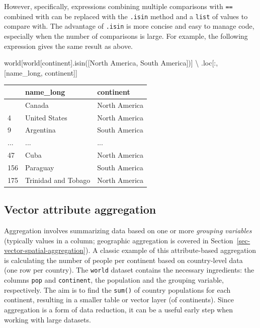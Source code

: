 \documentclass[
  letterpaper,
]{krantz}
\newenvironment{Shaded}{\begin{snugshade}}{\end{snugshade}}
\newcommand{\NormalTok}[1]{\textcolor[rgb]{0.00,0.23,0.31}{#1}}
\newcommand{\OperatorTok}[1]{\textcolor[rgb]{0.37,0.37,0.37}{#1}}
\newcommand{\StringTok}[1]{\textcolor[rgb]{0.13,0.47,0.30}{#1}}
\begin{document}
However, specifically, expressions combining multiple comparisons with
\texttt{==} combined with \texttt{\textbar{}} can be replaced with the
\texttt{.isin} method and a \texttt{list} of values to compare with. The
advantage of \texttt{.isin} is more concise and easy to manage code,
especially when the number of comparisons is large. For example, the
following expression gives the same result as above.

\begin{Shaded}
\begin{Highlighting}[]
\NormalTok{world[world[}\StringTok{\textquotesingle{}continent\textquotesingle{}}\NormalTok{].isin([}\StringTok{\textquotesingle{}North America\textquotesingle{}}\NormalTok{, }\StringTok{\textquotesingle{}South America\textquotesingle{}}\NormalTok{])]  }\OperatorTok{\textbackslash{}}
\NormalTok{    .loc[:, [}\StringTok{\textquotesingle{}name\_long\textquotesingle{}}\NormalTok{, }\StringTok{\textquotesingle{}continent\textquotesingle{}}\NormalTok{]]}
\end{Highlighting}
\end{Shaded}

\begin{longtable}[]{@{}lll@{}}
\toprule\noalign{}
& name\_long & continent \\
\midrule\noalign{}
\endhead
\bottomrule\noalign{}
\endlastfoot
3 & Canada & North America \\
4 & United States & North America \\
9 & Argentina & South America \\
... & ... & ... \\
47 & Cuba & North America \\
156 & Paraguay & South America \\
175 & Trinidad and Tobago & North America \\
\end{longtable}

\subsection{Vector attribute
aggregation}\label{sec-vector-attribute-aggregation}

Aggregation involves summarizing data based on one or more
\emph{grouping variables} (typically values in a column; geographic
aggregation is covered in Section~\ref{sec-vector-spatial-aggregation}).
A classic example of this attribute-based aggregation is calculating the
number of people per continent based on country-level data (one row per
country). The \texttt{world} dataset contains the necessary ingredients:
the columns \texttt{pop} and \texttt{continent}, the population and the
grouping variable, respectively. The aim is to find the \texttt{sum()}
of country populations for each continent, resulting in a smaller table
or vector layer (of continents). Since aggregation is a form of data
reduction, it can be a useful early step when working with large
datasets.
\end{document}
